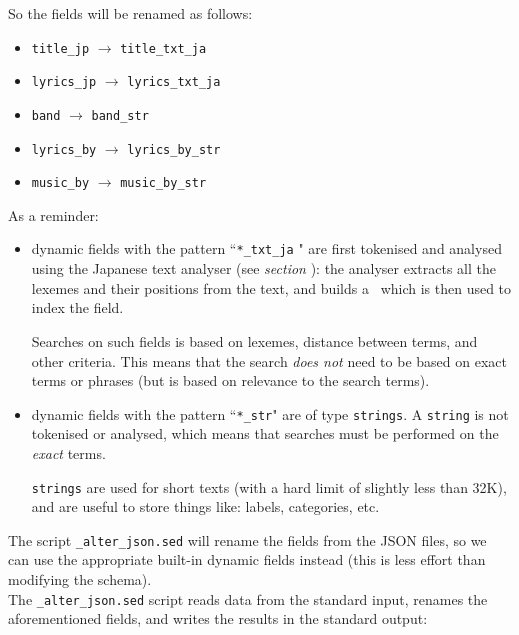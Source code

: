 So the fields will be renamed as follows:

\begin{itemize}
	\item \texttt{title\_jp} $\rightarrow$ \texttt{title\_txt\_ja}
	\item \texttt{lyrics\_jp} $\rightarrow$ \texttt{lyrics\_txt\_ja}
	\item \texttt{band} $\rightarrow$ \texttt{band\_str}
	\item \texttt{lyrics\_by} $\rightarrow$ \texttt{lyrics\_by\_str}
	\item \texttt{music\_by} $\rightarrow$ \texttt{music\_by\_str}
\end{itemize}


As a reminder:

\begin{itemize}
	\item dynamic fields with the pattern ``\texttt{*\_txt\_ja} " are first tokenised and analysed using the Japanese text analyser (see \emph{section }): the analyser extracts all the lexemes and their positions from the text, and builds a \termsVector\ which is then used to index the field. 
	
	Searches on such fields is based on lexemes, distance between terms, and other criteria. This means that the search \emph{does not} need to be based on exact terms or phrases (but is based on relevance to the search terms).
	
	\item dynamic fields with the pattern ``\texttt{*\_str}" are of type \texttt{strings}. A \texttt{string} is not tokenised or analysed, which means that searches must be performed on the \emph{exact} terms.
	
	\texttt{strings} are used for short texts (with a hard limit of slightly less than 32K), and are useful to store things like: labels, categories, etc.
\end{itemize}

\bigskip

The script \texttt{\_alter\_json.sed} will rename the fields from the JSON files, so we can use the appropriate built-in dynamic fields instead (this is less effort than modifying the schema). \\

The \texttt{\_alter\_json.sed} script reads data from the standard input, renames the aforementioned fields, and writes the results in the standard output: \\

